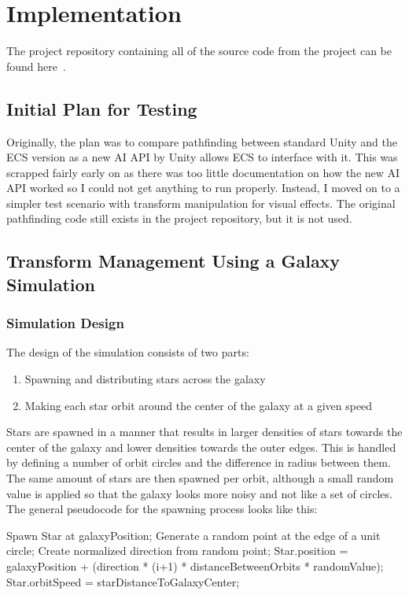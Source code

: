 \chapter{Implementation}
The project repository containing all of the source code from the project can be found here~\cite{projectrepo}.

\section{Initial Plan for Testing}
Originally, the plan was to compare pathfinding between standard Unity and the ECS version as a new AI API by Unity allows ECS to interface with it. This was scrapped fairly early on as there was too little documentation on how the new AI API worked so I could not get anything to run properly. Instead, I moved on to a simpler test scenario with transform manipulation for visual effects. The original pathfinding code still exists in the project repository, but it is not used.

\section{Transform Management Using a Galaxy Simulation}
\subsection{Simulation Design}
The design of the simulation consists of two parts: 
\begin{enumerate}
    \item Spawning and distributing stars across the galaxy
    \item Making each star orbit around the center of the galaxy at a given speed
\end{enumerate}
Stars are spawned in a manner that results in larger densities of stars towards the center of the galaxy and lower densities towards the outer edges. This is handled by defining a number of orbit circles and the difference in radius between them. The same amount of stars are then spawned per orbit, although a small random value is applied so that the galaxy looks more noisy and not like a set of circles. The general pseudocode for the spawning process looks like this:

\begin{algorithmic}
         \State Spawn Star at galaxyPosition;
         \State Generate a random point at the edge of a unit circle;
         \State Create normalized direction from random point;
         \State Star.position = galaxyPosition +
         \State (direction * (i+1) * distanceBetweenOrbits * randomValue);
         \State Star.orbitSpeed = starDistanceToGalaxyCenter;
    \EndFor
\EndFor
\end{algorithmic}

